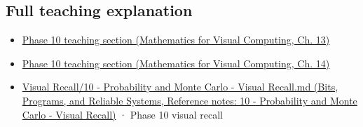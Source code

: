 \subsection{Full teaching explanation}\label{appendix-6a7869dd79a6-full-teaching-explanation}

\hypertarget{appendix-6a7869dd79a6-full-teaching-explanation}{}

\begin{itemize}
\tightlist
\item
  \href{../02-Mathematics-for-Visual-Computing/main.pdf\#nameddest=02-foundations-ii-ch029-a-computer-produces-deterministic-pseudorandom-sequences}{Phase 10 teaching section (Mathematics for Visual Computing, Ch. 13)}
\item
  \href{../02-Mathematics-for-Visual-Computing/main.pdf\#nameddest=02-foundations-ii-ch030-monte-carlo-estimates-trade-computation-for-uncertainty}{Phase 10 teaching section (Mathematics for Visual Computing, Ch. 14)}
\item
  \href{../01-Bits-Programs-and-Reliable-Systems/main.pdf\#nameddest=appendix-cb5af353ef77}{Visual Recall/10 - Probability and Monte Carlo - Visual Recall.md (Bits, Programs, and Reliable Systems, Reference notes: 10 - Probability and Monte Carlo - Visual Recall)} · Phase 10 visual recall
\end{itemize}

